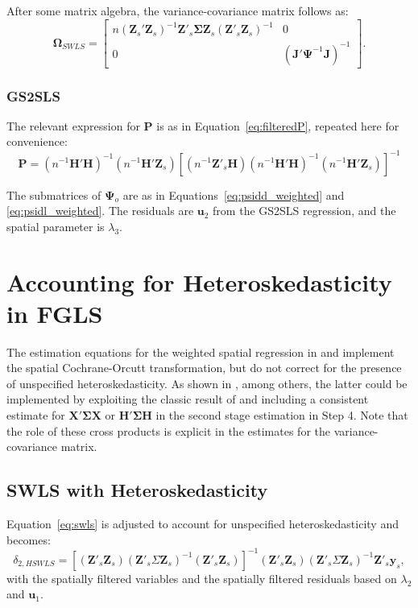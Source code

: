 \documentclass{article}
\begin{document}
After some matrix algebra, the variance-covariance matrix follows as:
\begin{equation*}
\mathbf{\Omega}_{SWLS} =
\left[
\begin{matrix}
n (\mathbf{Z}_s'\mathbf{Z}_s )^{-1} \mathbf{Z'}_s \mathbf{\Sigma}
  \mathbf{Z}_s (\mathbf{Z'}_s \mathbf{Z}_s )^{-1} & 0\\
 0 & ( \mathbf{J'} \mathbf{\Psi}^{-1} \mathbf{J} )^{-1}
 \end{matrix}
\right].
\end{equation*}

\subsubsection{GS2SLS}\label{ss:asyvargs2sls}


The relevant expression for $\mathbf{P}$ is as in Equation~\ref{eq:filteredP}, repeated here for convenience:
\begin{equation*}
\mathbf{P} = (n^{-1}\mathbf{H'H})^{-1} ( n^{-1} \mathbf{H'Z}_s ) 
        [ (n^{-1} \mathbf{Z'}_s \mathbf{H} ) (n^{-1} \mathbf{H'H} )^{-1} (n^{-1} \mathbf{H'Z}_s) ]^{-1}
\end{equation*}

The submatrices of $\mathbf{\Psi}_o$ are as in Equations~\ref{eq:psidd_weighted}
and \ref{eq:psidl_weighted}. The residuals are $\mathbf{u}_2$ from the GS2SLS regression,
and the spatial parameter is $\lambda_3$.



\section{Accounting for Heteroskedasticity in FGLS}
The estimation equations for the weighted spatial regression in 
\cite{KelejianPrucha:09} and \cite{Arraizetal:10}  implement the
spatial Cochrane-Orcutt transformation, but do not correct for the
presence of unspecified heteroskedasticity. As shown in \citet[p. 931]{Anselin:06},
among others, the latter could be
implemented by exploiting the
classic result of \cite{White:80} and including a consistent estimate
for $\mathbf{X' \Sigma X}$ or $\mathbf{H' \Sigma H}$ in the second stage
estimation in Step 4. Note that the role of these cross products is explicit
in the estimates for the variance-covariance matrix.

\subsection{SWLS with Heteroskedasticity}
Equation~\ref{eq:swls} is adjusted to account for unspecified heteroskedasticity
and becomes:
\begin{equation*}
\delta_{2,HSWLS} =  [ ( \mathbf{Z'}_s \mathbf{Z}_s ) ( \mathbf{Z'}_s \Sigma \mathbf{Z}_s )^{-1}
 ( \mathbf{Z'}_s \mathbf{Z}_s) ]^{-1} ( \mathbf{Z'}_s \mathbf{Z}_s )  ( \mathbf{Z'}_s \Sigma \mathbf{Z}_s )^{-1} \mathbf{Z'}_s \mathbf{y}_s,
\end{equation*}
with the spatially filtered variables and the spatially filtered residuals based on $\lambda_2$
and $\mathbf{u}_1$.
\end{document}
